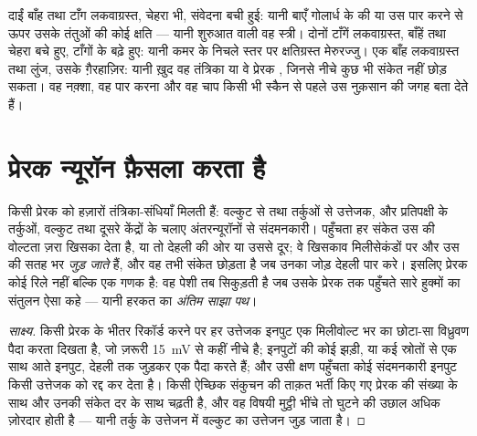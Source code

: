 \begin{example}[कोई लकवा पढ़ना]\label{ex:g12:brain-and-movement:paralysis}
दाईं बाँह तथा टाँग लकवाग्रस्त, चेहरा भी, संवेदना बची हुई: यानी बाएँ गोलार्ध
के  की या उस पार करने से ऊपर उसके तंतुओं की कोई क्षति --- यानी
शुरुआत वाली वह स्त्री। दोनों टाँगें लकवाग्रस्त, बाँहें तथा चेहरा बचे हुए,
टाँगों के  बढ़े हुए: यानी कमर के निचले स्तर पर क्षतिग्रस्त
मेरुरज्जु। एक बाँह लकवाग्रस्त तथा लुंज, उसके  ग़ैरहाज़िर: यानी
ख़ुद वह तंत्रिका या वे प्रेरक , जिनसे नीचे कुछ भी संकेत नहीं छोड़
सकता। वह नक़्शा, वह पार करना और वह चाप किसी भी स्कैन से पहले उस नुक़सान की
जगह बता देते हैं।
\end{example}

\section{प्रेरक न्यूरॉन फ़ैसला करता है}

\begin{proposition}[प्रेरक न्यूरॉन पर एकीकरण]\label{prop:g12:brain-and-movement:integration}
किसी प्रेरक  को हज़ारों तंत्रिका-संधियाँ मिलती हैं: वल्कुट से तथा
तर्कुओं से उत्तेजक, और प्रतिपक्षी के तर्कुओं, वल्कुट तथा दूसरे केंद्रों के
चलाए अंतरन्यूरॉनों से संदमनकारी। पहुँचता हर संकेत उस  की वोल्टता ज़रा
खिसका देता है, या तो देहली की ओर या उससे दूर; वे खिसकाव मिलीसेकंडों पर और उस
 की सतह भर \emph{जुड़ जाते} हैं, और वह  तभी संकेत छोड़ता है जब
उनका जोड़ देहली पार करे। इसलिए प्रेरक  कोई रिले नहीं बल्कि एक गणक है:
वह पेशी तब सिकुड़ती है जब उसके प्रेरक  तक पहुँचते सारे हुक्मों का
संतुलन ऐसा कहे --- यानी हरकत का
\emph{अंतिम साझा पथ}।
\end{proposition}
\begin{proof}[साक्ष्य]
किसी प्रेरक  के भीतर रिकॉर्ड करने पर हर उत्तेजक इनपुट एक मिलीवोल्ट
भर का छोटा-सा विध्रुवण पैदा करता दिखता है, जो ज़रूरी \qty{15}{mV} से कहीं
नीचे है; इनपुटों की कोई झड़ी, या कई स्रोतों से एक साथ आते इनपुट, देहली तक
जुड़कर एक  पैदा करते हैं; और उसी क्षण पहुँचता कोई संदमनकारी इनपुट
किसी उत्तेजक को रद्द कर देता है। किसी ऐच्छिक संकुचन की ताक़त भर्ती किए गए
प्रेरक  की संख्या के साथ और उनकी संकेत दर के साथ चढ़ती है, और वह
विषयी मुट्ठी भींचे तो घुटने की उछाल अधिक ज़ोरदार होती है --- यानी तर्कु के
उत्तेजन में वल्कुट का उत्तेजन जुड़ जाता है।
\end{proof}

